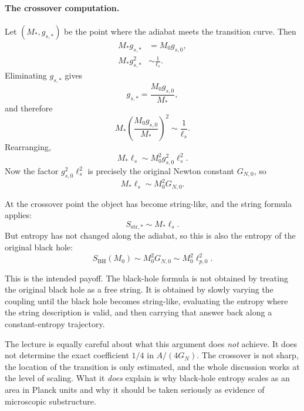 \paragraph{The crossover computation.}
Let \((M_\ast,g_{s,\ast})\) be the point where the adiabat meets the transition curve. Then
\begin{align}
M_\ast g_{s,\ast} &= M_0 g_{s,0}, \\
M_\ast g_{s,\ast}^2 &\sim \frac{1}{\ell_s}.
\end{align}
Eliminating \(g_{s,\ast}\) gives
\begin{equation}
g_{s,\ast}=\frac{M_0g_{s,0}}{M_\ast},
\end{equation}
and therefore
\begin{equation}
M_\ast \left(\frac{M_0g_{s,0}}{M_\ast}\right)^2 \sim \frac{1}{\ell_s}.
\end{equation}
Rearranging,
\begin{equation}
M_\ast \ell_s \sim M_0^2 g_{s,0}^2 \ell_s^2.
\end{equation}
Now the factor \(g_{s,0}^2\ell_s^2\) is precisely the original Newton constant \(G_{N,0}\), so
\begin{equation}
M_\ast \ell_s \sim M_0^2 G_{N,0}.
\end{equation}

At the crossover point the object has become string-like, and the string formula applies:
\begin{equation}
S_{\mathrm{str},\ast} \sim M_\ast \ell_s.
\end{equation}
But entropy has not changed along the adiabat, so this is also the entropy of the original black hole:
\begin{equation}
S_{\mathrm{BH}}(M_0) \sim M_0^2 G_{N,0} \sim M_0^2\ell_{p,0}^2.
\end{equation}

This is the intended payoff. The black-hole formula is not obtained by treating the original black hole as a free string. It is obtained by slowly varying the coupling until the black hole becomes string-like, evaluating the entropy where the string description is valid, and then carrying that answer back along a constant-entropy trajectory.

The lecture is equally careful about what this argument does \emph{not} achieve. It does not determine the exact coefficient \(1/4\) in \(A/(4G_N)\). The crossover is not sharp, the location of the transition is only estimated, and the whole discussion works at the level of scaling. What it \emph{does} explain is why black-hole entropy scales as an area in Planck units and why it should be taken seriously as evidence of microscopic substructure.

